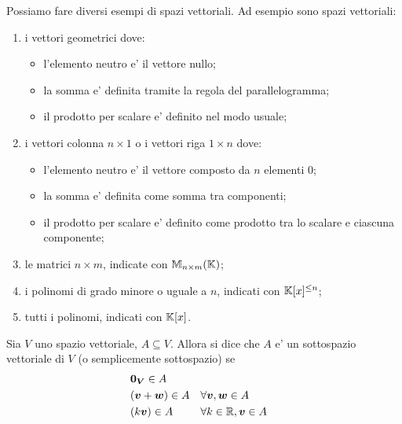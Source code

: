 \begin{example}
    Possiamo fare diversi esempi di spazi vettoriali. Ad esempio sono spazi vettoriali:
    \begin{enumerate}
        \item i vettori geometrici dove:
        \begin{itemize}
            \item l'elemento neutro e' il vettore nullo;
            \item la somma e' definita tramite la regola del parallelogramma;
            \item il prodotto per scalare e' definito nel modo usuale;
        \end{itemize}
        \item i vettori colonna $n \times 1$ o i vettori riga $1 \times n$ dove:
        \begin{itemize}
            \item l'elemento neutro e' il vettore composto da $n$ elementi $0$;
            \item la somma e' definita come somma tra componenti;
            \item il prodotto per scalare e' definito come prodotto tra lo scalare e ciascuna componente;
        \end{itemize}
        \item le matrici $n \times m$, indicate con $\mathbb{M}_{n \times m}(\mathbb{K})$;
        \item i polinomi di grado minore o uguale a $n$, indicati con $\mathbb{K}[x]^{\leq n}$;
        \item tutti i polinomi, indicati con $\mathbb{K}[x]$.
    \end{enumerate}
\end{example}

\begin{definition}
    Sia $V$ uno spazio vettoriale, $A \subseteq V$. Allora si dice che $A$ e' un sottospazio vettoriale di $V$ (o semplicemente sottospazio) se
    \begin{align}
        &\bm{0_V} \in A \\
        &(\bm{v} + \bm{w}) \in A    &&\forall \bm{v}, \bm{w} \in A \\
        &(k\bm{v}) \in A            &&\forall k \in \mathbb{R}, \bm{v} \in A
    \end{align}
\end{definition}

